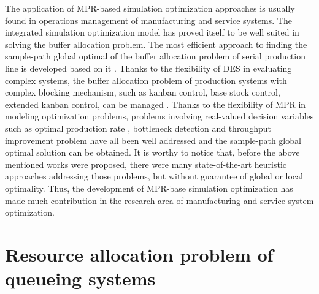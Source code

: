 \documentclass[]{interact}
\theoremstyle{plain}%
\theoremstyle{definition}
\theoremstyle{remark}
\begin{document}
The application of MPR-based simulation optimization approaches is usually found in operations management of manufacturing and service systems. The integrated simulation optimization model has proved itself to be well suited in solving the buffer allocation problem. The most efficient approach to finding the sample-path global optimal of the buffer allocation problem of serial production line is developed based on it \citep{zhang2020BAP}. Thanks to the flexibility of DES in evaluating complex systems, the buffer allocation problem of production systems with complex blocking mechanism, such as kanban control, base stock control, extended kanban control, can be managed \citep{pedrielli2015integrated}. Thanks to the flexibility of MPR in modeling optimization problems, problems involving real-valued decision variables such as optimal production rate \citep{tan2015mathematical}, bottleneck detection \citep{zhang2018data} and throughput improvement problem \citep{zhang2020models} have all been well addressed and the sample-path global optimal solution can be obtained. It is worthy to notice that, before the above mentioned works were proposed, there were many state-of-the-art heuristic approaches addressing those problems, but without guarantee of global or local optimality. Thus, the development of MPR-base simulation optimization has made much contribution in the research area of manufacturing and service system optimization.



\section{Resource allocation problem of queueing systems}
\end{document}

